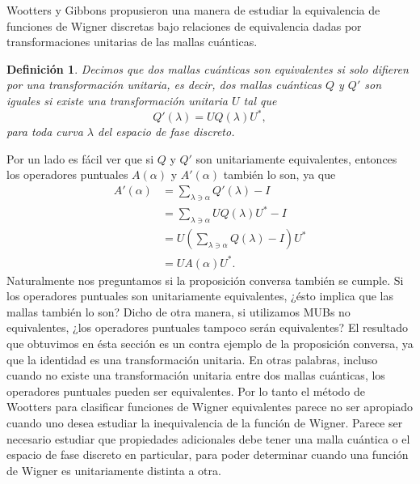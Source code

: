 \documentclass[a4paper,11pt]{report}
\newtheorem{definition}{Definición}
\begin{document}
  Wootters y Gibbons propusieron una manera de estudiar la
  equivalencia de funciones de Wigner discretas bajo
  relaciones de equivalencia dadas por transformaciones
  unitarias de las mallas cuánticas.
  \begin{definition}
    Decimos que dos mallas cuánticas son equivalentes si
    solo difieren por una transformación unitaria, es decir,
    dos mallas cuánticas $Q$ y $Q'$ son iguales si existe
    una transformación unitaria $U$ tal que
    \begin{equation}
      Q'(\lambda)
      = U Q(\lambda) U^{*},
    \end{equation}
    para toda curva $\lambda$ del espacio de fase discreto.
  \end{definition}
  Por un lado es fácil ver que si $Q$ y $Q'$ son
  unitariamente equivalentes, entonces los operadores
  puntuales $A(\alpha)$ y $A'(\alpha)$ también lo son, ya
  que
  \begin{align}
    A'(\alpha)
    &= \sum_{\lambda \ni \alpha}^{} Q'(\lambda) - I \\
    &= \sum_{\lambda \ni \alpha}^{} U Q(\lambda) U^{*} - I
    \\
    &= U \left( 
      \sum_{\lambda \ni \alpha}^{} Q(\lambda) - I
    \right) U^{*} \\
    &= U A(\alpha) U^{*}.
  \end{align}
  Naturalmente nos preguntamos si la proposición conversa
  también se cumple. Si los operadores puntuales son
  unitariamente equivalentes, ¿ésto implica que las mallas
  también lo son? Dicho de otra manera, si utilizamos MUBs
  no equivalentes, ¿los operadores puntuales tampoco serán
  equivalentes? El resultado que obtuvimos en ésta sección
  es un contra ejemplo de la proposición conversa, ya que la
  identidad es una transformación unitaria. En otras
  palabras, incluso cuando no existe una transformación
  unitaria entre dos mallas cuánticas, los operadores
  puntuales pueden ser equivalentes. Por lo tanto el método
  de Wootters para clasificar funciones de Wigner
  equivalentes parece no ser apropiado cuando uno desea
  estudiar la inequivalencia de la función de Wigner.
  Parece ser necesario estudiar que propiedades adicionales
  debe tener una malla cuántica o el espacio de fase
  discreto en particular, para poder determinar cuando una
  función de Wigner es unitariamente distinta a otra. 
\end{document}
